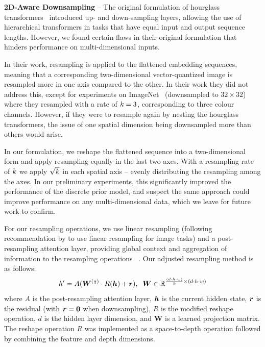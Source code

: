 \textbf{2D-Aware Downsampling} -- The original formulation of hourglass
transformers~\cite{nawrot2021hierarchical} introduced up- and down-sampling
layers, allowing the use of hierarchical transformers in tasks that have equal
input and output sequence lengths. However, we found certain flaws in their
original formulation that hinders performance on multi-dimensional inputs.

In their work, resampling is applied to the flattened embedding sequences,
meaning that a corresponding two-dimensional vector-quantized image is resampled
more in one axis compared to the other. In their work they did not address this,
except for experiments on ImageNet~\cite{russakovsky2015imagenet} (downsampled
to $32 \times 32$) where they resampled with a rate of $k=3$,
corresponding to three colour channels. However, if they were to resample again
by nesting the hourglass transformers, the issue of one spatial dimension being
downsampled more than others would arise.

In our formulation, we reshape the flattened sequence into a two-dimensional
form and apply resampling equally in the last two axes. With a resampling rate
of $k$ we apply $\sqrt{k}$ in each spatial axis -- evenly
distributing the resampling among the axes. In our preliminary experiments, this
significantly improved the performance of the discrete prior model, and suspect
the same approach could improve performance on any multi-dimensional data, which
we leave for future work to confirm.

For our resampling operations, we use linear resampling (following
recommendation by \citet{nawrot2021hierarchical} to use linear resampling for
image tasks) and a post-resampling attention layer, providing global context and
aggregation of information to the resampling operations ~\cite{nawrot2021hierarchical}. Our
adjusted resampling method is as follows:
\begin{equation}
    h' = A({\bm{W}}^{(\intercal)} \cdot R({\bm{h}}) + {\bm{r}}), \;\; {\bm{W}} \in
    \mathbb{R}^{\frac{(d \cdot h \cdot w)}{k} \times (d \cdot h \cdot w)}
\end{equation}
where $A$ is the post-resampling attention layer, ${\bm{h}}$ is the current hidden
state, ${\bm{r}}$ is the residual (with ${\bm{r}} = \bm{0}$ when downsampling), $R$ is the
modified reshape operation, $d$ is the hidden layer dimension, and $\textbf{W}$ is a
learned projection matrix. The reshape operation $R$ was implemented as a
space-to-depth operation followed by combining the feature and depth dimensions.

